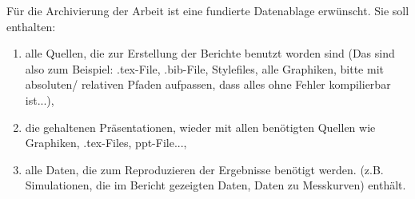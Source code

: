 Für die Archivierung der Arbeit ist eine fundierte Datenablage
erwünscht. Sie soll enthalten:

\begin{enumerate}
\item alle Quellen, die zur Erstellung der Berichte benutzt worden sind (Das sind also zum Beispiel: .tex-File, .bib-File, Stylefiles, alle Graphiken, bitte mit absoluten/ relativen Pfaden aufpassen, dass alles ohne Fehler kompilierbar ist...),


\item die gehaltenen Präsentationen, wieder mit allen benötigten Quellen wie Graphiken, .tex-Files, ppt-File...,
\item alle Daten, die zum Reproduzieren der Ergebnisse benötigt werden. (z.B. Simulationen, die im Bericht gezeigten Daten, Daten zu Messkurven)
enthält.
\end{enumerate}
